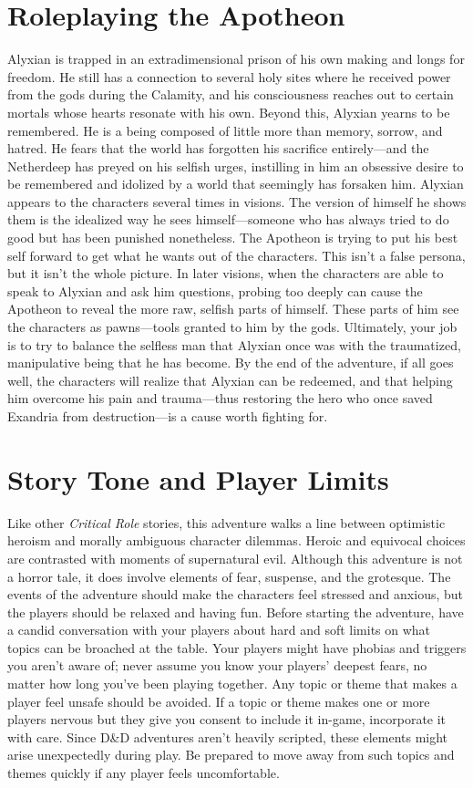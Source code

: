 \documentclass[10pt,a4,twoside,twocolumn,openany,nodeprecatedcode]{dndbook}
\begin{document}
\section{Roleplaying the Apotheon}
Alyxian is trapped in an extradimensional prison of his own making and longs for freedom. He still has a connection to several holy sites where he received power from the gods during the Calamity, and his consciousness reaches out to certain mortals whose hearts resonate with his own.
Beyond this, Alyxian yearns to be remembered. He is a being composed of little more than memory, sorrow, and hatred. He fears that the world has forgotten his sacrifice entirely—and the Netherdeep has preyed on his selfish urges, instilling in him an obsessive desire to be remembered and idolized by a world that seemingly has forsaken him.
Alyxian appears to the characters several times in visions. The version of himself he shows them is the idealized way he sees himself—someone who has always tried to do good but has been punished nonetheless. The Apotheon is trying to put his best self forward to get what he wants out of the characters. This isn't a false persona, but it isn't the whole picture. In later visions, when the characters are able to speak to Alyxian and ask him questions, probing too deeply can cause the Apotheon to reveal the more raw, selfish parts of himself. These parts of him see the characters as pawns—tools granted to him by the gods.
Ultimately, your job is to try to balance the selfless man that Alyxian once was with the traumatized, manipulative being that he has become. By the end of the adventure, if all goes well, the characters will realize that Alyxian can be redeemed, and that helping him overcome his pain and trauma—thus restoring the hero who once saved Exandria from destruction—is a cause worth fighting for.
\section{Story Tone and Player Limits}
Like other \textit{Critical Role} stories, this adventure walks a line between optimistic heroism and morally ambiguous character dilemmas. Heroic and equivocal choices are contrasted with moments of supernatural evil. Although this adventure is not a horror tale, it does involve elements of fear, suspense, and the grotesque.
The events of the adventure should make the characters feel stressed and anxious, but the players should be relaxed and having fun. Before starting the adventure, have a candid conversation with your players about hard and soft limits on what topics can be broached at the table. Your players might have phobias and triggers you aren't aware of; never assume you know your players' deepest fears, no matter how long you've been playing together. Any topic or theme that makes a player feel unsafe should be avoided. If a topic or theme makes one or more players nervous but they give you consent to include it in-game, incorporate it with care. Since D\&D adventures aren't heavily scripted, these elements might arise unexpectedly during play. Be prepared to move away from such topics and themes quickly if any player feels uncomfortable.
\end{document}
